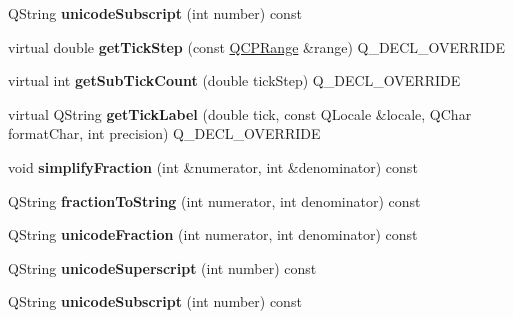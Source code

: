 \begin{DoxyCompactItemize}
\item 
Q\+String {\bfseries unicode\+Subscript} (int number) const \hypertarget{class_q_c_p_axis_ticker_pi_af714773472781345bef39a9ab85b691c}{}\label{class_q_c_p_axis_ticker_pi_af714773472781345bef39a9ab85b691c}

\item 
virtual double {\bfseries get\+Tick\+Step} (const \hyperlink{class_q_c_p_range}{Q\+C\+P\+Range} \&range) Q\+\_\+\+D\+E\+C\+L\+\_\+\+O\+V\+E\+R\+R\+I\+DE\hypertarget{class_q_c_p_axis_ticker_pi_a1c7fb37262f89bbd432a5b5799df5778}{}\label{class_q_c_p_axis_ticker_pi_a1c7fb37262f89bbd432a5b5799df5778}

\item 
virtual int {\bfseries get\+Sub\+Tick\+Count} (double tick\+Step) Q\+\_\+\+D\+E\+C\+L\+\_\+\+O\+V\+E\+R\+R\+I\+DE\hypertarget{class_q_c_p_axis_ticker_pi_a85b1a9eda8ad2c327bebe0439c4529dc}{}\label{class_q_c_p_axis_ticker_pi_a85b1a9eda8ad2c327bebe0439c4529dc}

\item 
virtual Q\+String {\bfseries get\+Tick\+Label} (double tick, const Q\+Locale \&locale, Q\+Char format\+Char, int precision) Q\+\_\+\+D\+E\+C\+L\+\_\+\+O\+V\+E\+R\+R\+I\+DE\hypertarget{class_q_c_p_axis_ticker_pi_a77e9a2537bfdf6441c3dc7a4865edd7d}{}\label{class_q_c_p_axis_ticker_pi_a77e9a2537bfdf6441c3dc7a4865edd7d}

\item 
void {\bfseries simplify\+Fraction} (int \&numerator, int \&denominator) const \hypertarget{class_q_c_p_axis_ticker_pi_a54f04ef1a6d154e0008028b2a00c7442}{}\label{class_q_c_p_axis_ticker_pi_a54f04ef1a6d154e0008028b2a00c7442}

\item 
Q\+String {\bfseries fraction\+To\+String} (int numerator, int denominator) const \hypertarget{class_q_c_p_axis_ticker_pi_ac51d1438d383d802d28c387d6d89e5b4}{}\label{class_q_c_p_axis_ticker_pi_ac51d1438d383d802d28c387d6d89e5b4}

\item 
Q\+String {\bfseries unicode\+Fraction} (int numerator, int denominator) const \hypertarget{class_q_c_p_axis_ticker_pi_a4d9c2f7ba67862646dcbb76956639df7}{}\label{class_q_c_p_axis_ticker_pi_a4d9c2f7ba67862646dcbb76956639df7}

\item 
Q\+String {\bfseries unicode\+Superscript} (int number) const \hypertarget{class_q_c_p_axis_ticker_pi_a32593f7ae19b82ca48e838ae74dfe7a6}{}\label{class_q_c_p_axis_ticker_pi_a32593f7ae19b82ca48e838ae74dfe7a6}

\item 
Q\+String {\bfseries unicode\+Subscript} (int number) const \hypertarget{class_q_c_p_axis_ticker_pi_af714773472781345bef39a9ab85b691c}{}\label{class_q_c_p_axis_ticker_pi_af714773472781345bef39a9ab85b691c}

\end{DoxyCompactItemize}
